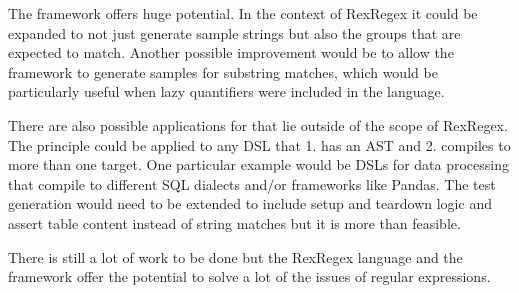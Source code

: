 The \utgast{} framework offers huge potential. In the context of RexRegex it could be expanded to not just generate sample strings but also the groups that are expected to match. Another possible improvement would be to allow the framework to generate samples for substring matches, which would be particularly useful when lazy quantifiers were included in the language.

There are also possible applications for \utgast{} that lie outside of the scope of RexRegex. The principle could be applied to any DSL that 1. has an AST and 2. compiles to more than one target. One particular example would be DSLs for data processing that compile to different SQL dialects and/or frameworks like Pandas. The test generation would need to be extended to include setup and teardown logic and assert table content instead of string matches but it is more than feasible. 

There is still a lot of work to be done but the RexRegex language and the \utgast{} framework offer the potential to solve a lot of the issues of regular expressions.
